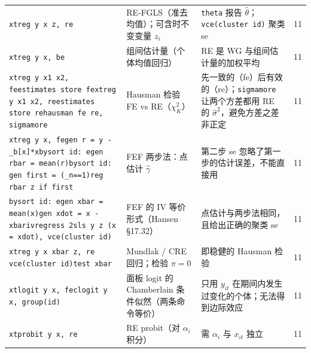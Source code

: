 {\begin{longtable}{@{}>{\raggedright\arraybackslash\small}p{5.3cm}>{\raggedright\arraybackslash\small}p{3.8cm}>{\raggedright\arraybackslash\small}p{5.3cm}>{\centering\arraybackslash\small}p{0.9cm}@{}}
\texttt{xtreg y x z, re} & RE-FGLS（准去均值）；可含时不变变量 $z_i$ & \texttt{theta} 报告 $\hat\theta$；\texttt{vce(cluster id)} 聚类 se & 11\\
\addlinespace[1pt]
\texttt{xtreg y x, be} & 组间估计量（个体均值回归） & RE 是 WG 与组间估计量的加权平均 & 11\\
\addlinespace[1pt]
\texttt{xtreg y x1 x2, fe}\newline \texttt{estimates store fe}\newline \texttt{xtreg y x1 x2, re}\newline \texttt{estimates store re}\newline \texttt{hausman fe re, sigmamore} & Hausman 检验 FE vs RE（$\chi^2_K$） & 先一致的（fe）后有效的（re）；\texttt{sigmamore} 让两个方差都用 RE 的 $\hat\sigma^2$，避免方差之差非正定 & 11\\
\addlinespace[1pt]
\texttt{xtreg y x, fe}\newline \texttt{gen r = y - \_b[x]*x}\newline \texttt{bysort id: egen rbar = mean(r)}\newline \texttt{bysort id: gen first = (\_n==1)}\newline \texttt{reg rbar z if first} & FEF 两步法：点估计 $\hat\gamma$ & 第二步 se 忽略了第一步的估计误差，不能直接用 & 11\\
\addlinespace[1pt]
\texttt{bysort id: egen xbar = mean(x)}\newline \texttt{gen xdot = x - xbar}\newline \texttt{ivregress 2sls y z (x = xdot), vce(cluster id)} & FEF 的 IV 等价形式（Hansen §17.32） & 点估计与两步法相同，且给出正确的聚类 se & 11\\
\addlinespace[1pt]
\texttt{xtreg y x xbar z, re vce(cluster id)}\newline \texttt{test xbar} & Mundlak / CRE 回归；检验 $\pi=0$ & 即稳健的 Hausman 检验 & 11\\
\addlinespace[1pt]
\texttt{xtlogit y x, fe}\newline \texttt{clogit y x, group(id)} & 面板 logit 的 Chamberlain 条件似然（两条命令等价） & 只用 $y_{it}$ 在期间内发生过变化的个体；无法得到边际效应 & 11\\
\addlinespace[1pt]
\texttt{xtprobit y x, re} & RE probit（对 $\alpha_i$ 积分） & 需 $\alpha_i$ 与 $x_{it}$ 独立 & 11\\
\end{longtable}}


